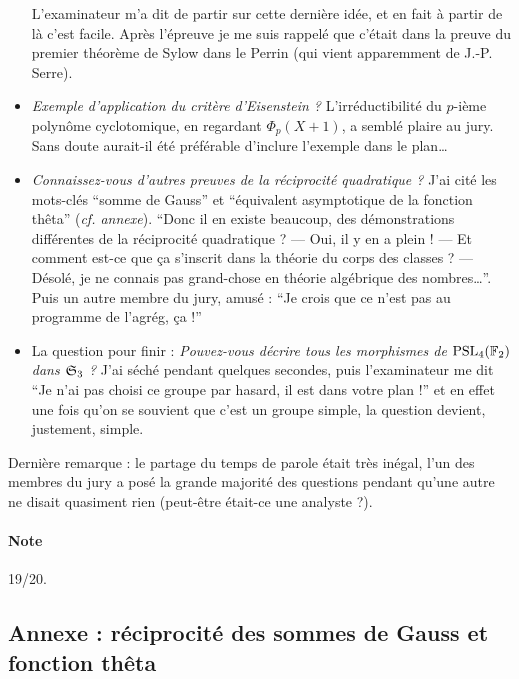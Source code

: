 \documentclass[a4paper, 11pt]{article}
\begin{document}
\begin{itemize}
  L'examinateur m'a dit de partir sur cette dernière idée, et en fait à partir
  de là c'est facile. Après l'épreuve je me suis rappelé que c'était dans la
  preuve du premier théorème de Sylow dans le Perrin (qui vient apparemment de
  J.-P. Serre).
\item \emph{Exemple d'application du critère d'Eisenstein ?} L'irréductibilité
  du $p$-ième polynôme cyclotomique, en regardant $\Phi_p(X+1)$, a semblé plaire
  au jury. Sans doute aurait-il été préférable d'inclure l'exemple dans le plan…
\item \emph{Connaissez-vous d'autres preuves de la réciprocité quadratique ?}
  J'ai cité les mots-clés \enquote{somme de Gauss} et \enquote{équivalent
    asymptotique de la fonction thêta} (\emph{cf. annexe}). \enquote{Donc il en
    existe beaucoup, des démonstrations différentes de la réciprocité
    quadratique ? --- Oui, il y en a plein ! --- Et comment est-ce que ça
    s'inscrit dans la théorie du corps des classes ? --- Désolé, je ne connais
    pas grand-chose en théorie algébrique des nombres…}.
  Puis un autre membre du jury, amusé : \enquote{Je crois que ce n'est pas au
    programme de l'agrég, ça !}
\item La question pour finir : \emph{Pouvez-vous décrire tous les morphismes de
    $\mathrm{PSL}_4(\mathbb{F}_2)$ dans $\mathfrak{S}_3$ ?} J'ai séché pendant quelques secondes,
  puis l'examinateur me dit \enquote{Je n'ai pas choisi ce groupe par hasard, il
    est dans votre plan !} et en effet une fois qu'on se souvient que c'est un
  groupe simple, la question devient, justement, simple.
\end{itemize}

Dernière remarque : le partage du temps de parole était très inégal, l'un des
membres du jury a posé la grande majorité des questions pendant qu'une autre ne
disait quasiment rien (peut-être était-ce une analyste ?).

\paragraph{Note} 19/20.

\newpage

\subsection*{Annexe : réciprocité des sommes de Gauss et fonction thêta}

\def\N{\mathbb{N}}
\def\R{\mathbb{R}}
\def\Re{\textnormal{Re}}
\end{document}
